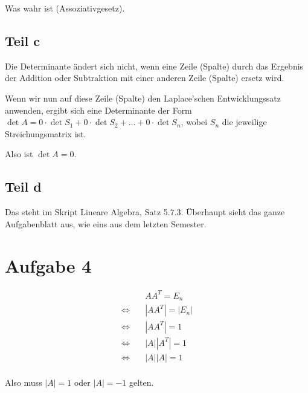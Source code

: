 \documentclass[a4paper,german,12pt,smallheadings]{scrartcl}
\begin{document}
Was wahr ist (Assoziativgesetz).

\subsection*{Teil c}
Die Determinante ändert sich nicht, wenn eine Zeile (Spalte) durch das Ergebnis
der Addition oder Subtraktion mit einer anderen Zeile (Spalte) ersetz wird.

Wenn wir nun auf diese Zeile (Spalte) den Laplace'schen Entwicklungssatz
anwenden, ergibt sich eine Determinante der Form $\det A = 0 \cdot \det S_1 + 0
\cdot \det S_2 + \dots + 0 \cdot \det S_n$, wobei $S_n$ die jeweilige
Streichungsmatrix ist.

Also ist $\det A = 0$.

\subsection*{Teil d}

Das steht im Skript Lineare Algebra, Satz 5.7.3. Überhaupt sieht das ganze
Aufgabenblatt aus, wie eins aus dem letzten Semester.

\section{Aufgabe 4}
\begin{align*}
  &AA^T = E_n\\
  \Leftrightarrow\quad&|AA^T| = |E_n| \\
  \Leftrightarrow\quad&|AA^T| = 1 \\
  \Leftrightarrow\quad&|A||A^T| = 1 \\
  \Leftrightarrow\quad&|A||A| = 1 \\
\end{align*}

Also muss $|A| = 1$ oder $|A| = -1$ gelten.
\end{document}
